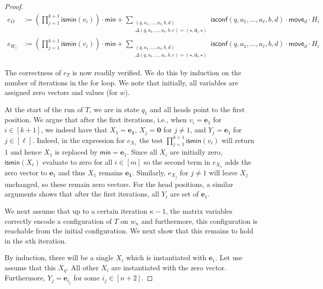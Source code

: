 \begin{proof}
\begin{align*}
	e_{O}&:=\left(\prod_{j=1}^{k+1} \textsf{ismin}(v_i)\right)\cdot\mathsf{min}
	+\sum_{\substack{(q,a_1,\ldots,a_\ell,b,d)\\
	\Delta(q,a_1,\ldots,a_\ell,b,c)=(\star,\mathsf{d_i},\star)}}\!\!\!\!\!\!\!\!\! \textsf{isconf}(q,a_1,\ldots,a_\ell,b,d)\cdot\mathsf{move}_d\cdot H_i\\
	e_{W_i}&:=\left(\prod_{j=1}^{k+1} \textsf{ismin}(v_i)\right)\cdot\mathsf{min}
	+\sum_{\substack{(q,a_1,\ldots,a_\ell,b,d)\\
	\Delta(q,a_1,\ldots,a_\ell,b,c)=(\star,\mathsf{d_i},\star)}}\!\!\!\!\!\!\!\!\! \textsf{isconf}(q,a_1,\ldots,a_\ell,b,d)\cdot\mathsf{move}_d\cdot H_i
\end{align*}

The correctness of $e_T$ is now readily verified. We do this by induction on the number of iterations in the for loop. We note that initially, all variables are assigned zero vectors and values (for $w$). 

At the start of the run of $T$, we are in state $q_1$ and all heads point to the first position. We argue that after the first 
iterations, i.e., when $v_i=\mathbf{e}_1$ for $i\in[k+1]$, we indeed have that $X_1=\mathbf{e_1}$, $X_j=\mathbf{0}$ for $j\neq 1$, and $Y_j=\mathbf{e}_1$ for $j\in[\ell]$. Indeed, in the expression for $e_{X_1}$ the test $\prod_{j=1}^{k+1} \textsf{ismin}(v_i)$ will return $1$ and hence $X_1$ is replaced by $\mathsf{min}=\mathbf{e}_1$. Since all $X_i$ are initially zero, $\mathsf{ismin}(X_i)$ evaluate to zero for all $i\in[m]$ so the second term in $e_{X_1}$ adds the zero vector to $\mathbf{e}_1$ and thus $X_1$ remains $\mathbf{e_1}$.
Similarly, $e_{X_j}$ for $j\neq 1$ will leave $X_j$ unchanged, so these remain zero vectors. For the head positions, a similar arguments shows that after the first iterations, all $Y_i$ are set of $\mathbf{e}_1$.

We next assume that up to a certain iteration $\kappa-1$, the matrix variables correctly encode a configuration of $T$ on $w_n$ and furthermore, this configuration is reachable from the initial configuration. We next show that this remains to hold in the $\kappa$th iteration.

By induction, there will be a single $X_i$ which is instantiated with $\mathbf{e}_1$. Let use assume that this $X_q$. All other $X_i$ are instantiated with the zero vector. Furthermore, $Y_j=\mathbf{e}_{i_j}$ for some $i_j\in[n+2]$. 


\end{proof}
